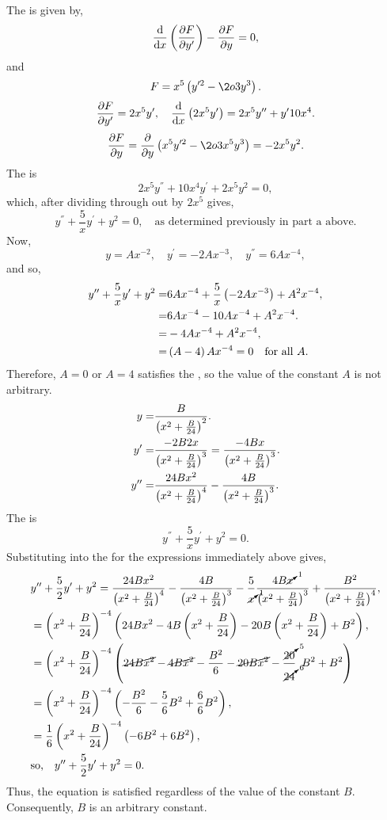 The \el is given by,
\[
	\ELE{F}{x}{y},
\]
and
\[
	F = x^5\lr{y^{\prime2} - \2o3 y^3}.
\]
\[
	\pderiv{F}{y^\prime} = 2x^5y^\prime,\quad \deriv{}{x}\lr{2x^5y^\prime} = 2x^5y^{\dprime} + y^\prime 10x^4.
\]
\[
	\pderiv{F}{y} = \pderiv{}{y}\lr{x^5y^{\prime2} - \2o3 x^5 y^3} = -2x^5y^2.
\]
The \el is
\[
	2x^5y^\dprime + 10x^4y^\prime + 2x^5 y^2 = 0,
\]
which, after dividing through out by $2x^5$ gives,
\[
	y^\dprime + \frac{5}{x} y^\prime + y^2 = 0,\quad \textrm{as determined previously in part a above.}
\]
Now,
\[
	y=Ax^{-2},\quad y^\prime = -2Ax^{-3},\quad y^\dprime = 6Ax^{-4},
\]
and so,
\begin{align*}
	y^\dprime + \frac{5}{x} y^\prime + y^2 =& 6Ax^{-4} + \frac{5}{x}\lr{-2Ax^{-3}} + A^2x^{-4},\\
	=& 6Ax^{-4} - 10Ax^{-4} + A^2x^{-4}.\\
	=& -4Ax^{-4} + A^2x^{-4},\\
	=& \lr{A-4}Ax^{-4} = 0\quad \textrm{for all } A.
\end{align*}
Therefore, $A=0$ or $A=4$ satisfies the \el, so the value of the constant $A$ is not arbitrary.
\begin{align*}
	y =& \frac{B}{\lr{x^2 + \frac{B}{24}}^2}.\\
	y^\prime =& \frac{-2B2x}{\lr{x^2 + \frac{B}{24}}^3} = \frac{-4Bx}{\lr{x^2 + \frac{B}{24}}^3}.\\
	y^\dprime =& \frac{24Bx^2}{\lr{x^2 + \frac{B}{24}}^4} - \frac{4B}{\lr{x^2 + \frac{B}{24}}^3}.
\end{align*}
The \el is
\[
	y^\dprime + \frac{5}{x}y^\prime + y^2 = 0.
\]
Substituting into the \el for the expressions immediately above gives,
\begin{align*}
	{}&y^\dprime + \frac{5}{2}y^\prime + y^2 = \frac{24Bx^2}{\lr{x^2 + \frac{B}{24}}^4} - \frac{4B}{\lr{x^2 + \frac{B}{24}}^3}
	- \frac{5}{\cancelto{1}{x}}\frac{4B\cancelto{1}{x}}{\lr{x^2 + \frac{B}{24}}^3} + \frac{B^2}{\lr{x^2 + \frac{B}{24}}^4},\\
	{}&= \lr{x^2 + \frac{B}{24}}^{-4}\lr{24Bx^2 - 4B\lr{x^2+\frac{B}{24}}-20B\lr{x^2+\frac{B}{24}} + B^2},\\
	{}&= \lr{x^2 + \frac{B}{24}}^{-4}\lr{\cancel{24Bx^2} - \cancel{4Bx^2} - \frac{B^2}{6} - \cancel{20Bx^2} - \frac{\cancelto{5}{20}}{\cancelto{6}{24}}\,\,\,B^2 + B^2}\\
	{}&= \lr{x^2 + \frac{B}{24}}^{-4}\lr{-\frac{B^2}{6} - \frac{5}{6}B^2 + \frac{6}{6}B^2},\\
	{}&= \frac{1}{6}\lr{x^2 + \frac{B}{24}}^{-4}\lr{-6B^2 + 6B^2},\\
	{}&\textrm{so,}\quad y^\dprime + \frac{5}{2}y^\prime + y^2 = 0.
\end{align*}
Thus, the \el equation is satisfied regardless of the value of the constant $B$. Consequently, $B$ is an arbitrary constant.